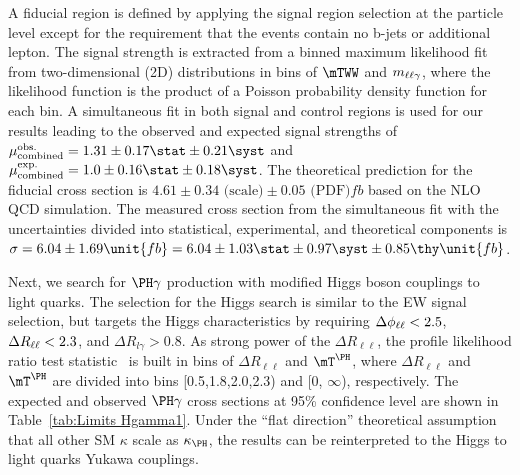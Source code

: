 A fiducial region is defined by applying the signal region selection at the particle level except for the requirement that the events contain no b-jets or additional lepton. The signal strength is extracted from a binned maximum likelihood fit from two-dimensional (2D) distributions in bins of $\mTWW$ and $m_{\ell\ell\gamma}$, where the likelihood function is the product of a Poisson probability density function for each bin. A simultaneous fit in both signal and control regions is used for our results leading to the observed and expected signal strengths of $\mu^{\text{obs.}}_{\text{combined}}=1.31 \pm 0.17 \stat \pm 0.21 \syst$ and $\mu^{\text{exp.}}_{\text{combined}}=1.0 \pm 0.16 \stat \pm 0.18 \syst$. The theoretical prediction for the fiducial cross section is $4.61 \pm 0.34 \text{ (scale)} \pm 0.05 \text{ (PDF)} \unit{fb}$ based on the NLO QCD \MGvATNLO simulation. The measured cross section from the simultaneous fit with the uncertainties divided into statistical, experimental, and theoretical components is $\sigma = 6.04 \pm 1.69 \unit{fb} =6.04 \pm 1.03 \stat \pm 0.97 \syst \pm 0.85 \thy \unit{fb}$.

Next, we search for $\PH\gamma$ production with modified Higgs boson couplings to light quarks. The selection for the Higgs search is similar to the EW signal selection, but targets the Higgs characteristics by requiring $\Delta\phi_{\ell\ell}<2.5$, $\Delta R_{\ell\ell}<2.3$, and $\Delta R_{l\gamma} >0.8$. As strong power of the $\Delta R_{\ell\ell}$, the profile likelihood ratio test statistic~\cite{CMS-NOTE-2011-005} is built in bins of $\Delta R_{\ell\ell}$ and $\mTH$, where $\Delta R_{\ell\ell}$ and $\mTH$ are divided into bins [0.5,1.8,2.0,2.3) and [0, $\infty$), respectively. The expected and observed $\PH\gamma$ cross sections at 95\% confidence level are shown in Table~\ref{tab:Limits Hgamma1}. Under the “flat direction” theoretical assumption~\cite{PhysRevD.103.095023} that all other SM $\kappa$ scale as $\kappa_{\PH}$, the results can be reinterpreted to the Higgs to light quarks Yukawa couplings.%

